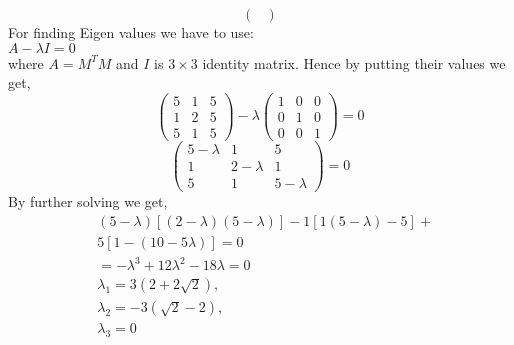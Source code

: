 \documentclass[journal,12pt,twocolumn]{IEEEtran}
\renewcommand\thesection{\arabic{section}}
\begin{document}
\begin{enumerate}[label=\thesection.\arabic*.,ref=\thesection.\theenumi]
$$\begin{pmatrix}
\end{pmatrix}
$$
For finding Eigen values we have to use:\\
$A-\lambda I=0$\\
where $A=M^TM$ and $I$ is $3\times 3$ identity matrix.
Hence by putting their values we get,
$$
\begin{pmatrix}
5 & 1 & 5\\
1 & 2 & 5\\
5 & 1 & 5
\end{pmatrix}
-\lambda
\begin{pmatrix}
1 & 0 & 0\\
0 & 1 & 0\\
0 & 0 & 1
\end{pmatrix}
=0
$$
$$
\begin{pmatrix}
5-\lambda & 1 & 5\\
1 & 2-\lambda & 1\\
5&1&5-\lambda
\end{pmatrix}
=0
$$
By further solving we get,
\begin{align*}
& (5-\lambda)[(2-\lambda)(5-\lambda)]-1[1(5-\lambda)-5]+\\
& 5[1-(10-5\lambda)]=0\\
& =-\lambda^{3}+12\lambda^{2}-18\lambda=0\\
& \lambda_1=3(2+2\sqrt{2}), \\          
& \lambda_2=-3(\sqrt{2}-2),\\
& \lambda_3=0
\end{align*}


\end{enumerate}
\end{document}
